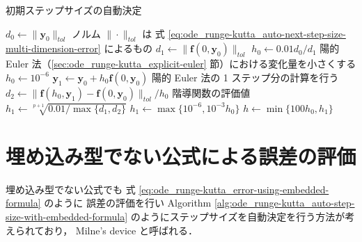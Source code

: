 \begin{algorithm}[tp]
    \caption{初期ステップサイズの自動決定 \cite[Section II.4]{Hairer1993}}
    \label{alg:ode_runge-kutta_auto-step-size-init}
    \begin{algorithmic}
        \State $d_0 \gets \|\bm{y}_0\|_{tol}$
        \Comment ノルム $\| \cdot \|_{tol}$ は
        式 \eqref{eq:ode_runge-kutta_auto-next-step-size-multi-dimension-error} によるもの
        \State $d_1 \gets \|\bm{f}(0, \bm{y}_0)\|_{tol}$
        \State $h_0 \gets 0.01 d_0 / d_1$
        \Comment 陽的 Euler 法（\ref{sec:ode_runge-kutta_explicit-euler} 節）における変化量を小さくする
        \Else
        \State $h_0 \gets 10^{-6}$
        \EndIf
        \State $\bm{y}_1 \gets \bm{y}_0 + h_0 \bm{f}(0, \bm{y}_0)$
        \Comment 陽的 Euler 法の 1 ステップ分の計算を行う
        \State $d_2 \gets \|\bm{f}(h_0, \bm{y}_1) - \bm{f}(0, \bm{y}_0)\|_{tol} / h_0$
         階導関数の評価値
        \State $h_1 \gets \sqrt[p+1]{0.01 / \max{\{d_1, d_2\}}}$
        \Else
        \State $h_1 \gets \max{\{10^{-6}, 10^{-3} h_0\}}$
        \EndIf
        \State $h \gets \min{\{100 h_0, h_1\}}$
        \EndProcedure
    \end{algorithmic}
\end{algorithm}

\section{埋め込み型でない公式による誤差の評価}

埋め込み型でない公式でも
式 \eqref{eq:ode_runge-kutta_error-using-embedded-formula} のように
誤差の評価を行い
Algorithm \ref{alg:ode_runge-kutta_auto-step-size-with-embedded-formula}
のようにステップサイズを自動決定を行う方法が考えられており，
Milne's device \cite[4.1 節 (b)]{Mitsui1993} と呼ばれる．

